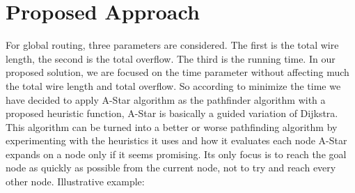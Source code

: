 \documentclass[conference]{IEEEtran}
\begin{document}
\section{Proposed Approach}
For global routing, three parameters are considered. The first is the total wire length, the second is the total overflow. The third is the running time. In our proposed solution, we are focused on the time parameter without affecting much the total wire length and total overflow. So according to minimize the time we have decided to apply A-Star algorithm as the pathfinder algorithm with a proposed heuristic function, A-Star is basically a guided variation of Dijkstra. This algorithm can be turned into a better or worse pathfinding algorithm by experimenting with the heuristics it uses and how it evaluates each node A-Star expands on a node only if it seems promising. Its only focus is to reach the goal node as quickly as possible from the current node, not to try and reach every other node. Illustrative example:
\end{document}
